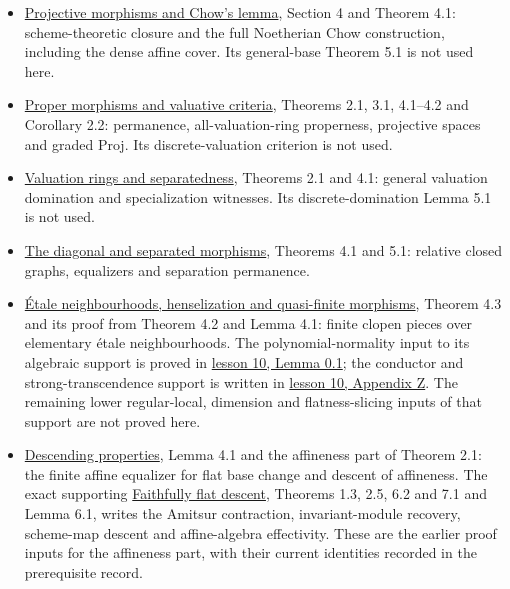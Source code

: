 \documentclass[11pt]{article}
\providecommand{\tightlist}{\setlength{\itemsep}{0pt}\setlength{\parskip}{0pt}}
\begin{document}
\begin{itemize}
\tightlist
\item
  \href{../AG-GS/prerequisites/AG-MO/projective-morphisms-and-chows-lemma.html}{Projective
  morphisms and Chow's lemma}, Section 4 and Theorem 4.1:
  scheme-theoretic closure and the full Noetherian Chow construction,
  including the dense affine cover. Its general-base Theorem 5.1 is not
  used here.
\item
  \href{../AG-GS/prerequisites/AG-MO/proper-morphisms-and-valuative-criteria.html}{Proper
  morphisms and valuative criteria}, Theorems 2.1, 3.1, 4.1--4.2 and
  Corollary 2.2: permanence, all-valuation-ring properness, projective
  spaces and graded Proj. Its discrete-valuation criterion is not used.
\item
  \href{../AG-GS/prerequisites/AG-MO/valuation-rings-and-separatedness.html}{Valuation
  rings and separatedness}, Theorems 2.1 and 4.1: general valuation
  domination and specialization witnesses. Its discrete-domination Lemma
  5.1 is not used.
\item
  \href{../AG-GS/prerequisites/AG-MO/the-diagonal-and-separated-morphisms.html}{The
  diagonal and separated morphisms}, Theorems 4.1 and 5.1: relative
  closed graphs, equalizers and separation permanence.
\item
  \href{../AG-FSE/etale-neighbourhoods-henselization-and-quasi-finite-morphisms.html}{Étale
  neighbourhoods, henselization and quasi-finite morphisms}, Theorem 4.3
  and its proof from Theorem 4.2 and Lemma 4.1: finite clopen pieces
  over elementary étale neighbourhoods. The polynomial-normality input
  to its algebraic support is proved in
  \href{the-theorem-on-formal-functions.html\#0-a-normality-input-in-the-algebraic-zariski-main-proof}{lesson
  10, Lemma 0.1}; the conductor and strong-transcendence support is
  written in \href{the-theorem-on-formal-functions.html}{lesson 10,
  Appendix Z}. The remaining lower regular-local, dimension and
  flatness-slicing inputs of that support are not proved here.
\item
  \href{../AG-DFG/AG-DFG-03.html}{Descending properties}, Lemma 4.1 and
  the affineness part of Theorem 2.1: the finite affine equalizer for
  flat base change and descent of affineness. The exact supporting
  \href{../AG-LTF/support/AG-DFG--AG-DFG-02.html}{Faithfully flat
  descent}, Theorems 1.3, 2.5, 6.2 and 7.1 and Lemma 6.1, writes the
  Amitsur contraction, invariant-module recovery, scheme-map descent and
  affine-algebra effectivity. These are the earlier proof inputs for the
  affineness part, with their current identities recorded in the
  prerequisite record.
\end{itemize}
\end{document}

